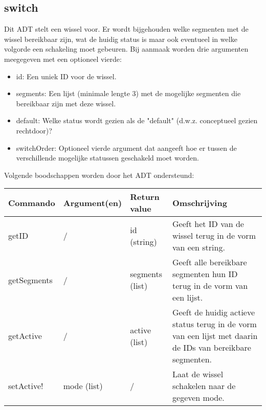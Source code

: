 \documentclass{article}
\begin{document}
\subsection{switch} %
Dit ADT stelt een wissel voor. Er wordt bijgehouden welke segmenten met de wissel bereikbaar zijn, wat de huidig status is maar ook eventueel in welke volgorde een schakeling moet gebeuren. Bij aanmaak worden drie argumenten meegegeven met een optioneel vierde:
\begin{itemize}
  \item id: Een uniek ID voor de wissel.
  \item segments: Een lijst (minimale lengte 3) met de mogelijke segmenten die bereikbaar zijn met deze wissel.
  \item default: Welke status wordt gezien als de "default" (d.w.z. conceptueel gezien rechtdoor)?
  \item switchOrder: Optioneel vierde argument dat aangeeft hoe er tussen de verschillende mogelijke statussen geschakeld moet worden.
\end{itemize}
Volgende boodschappen worden door het ADT ondersteund:
\begin{center}
    \begin{tabular}{ | l | l | l | p{8cm} |}
    \hline
    Commando & Argument(en) & Return value & Omschrijving \\ \hline
    getID & / & id (string) & Geeft het ID van de wissel terug in de vorm van een string. \\ \hline
    getSegments & / & segments (list) & Geeft alle bereikbare segmenten hun ID terug in de vorm van een lijst. \\ \hline
    getActive & / & active (list) & Geeft de huidig actieve status terug in de vorm van een lijst met daarin de IDs van bereikbare segmenten. \\ \hline
    setActive! & mode (list) & / & Laat de wissel schakelen naar de gegeven mode. \\ \hline
    \end{tabular}
\end{center}
\end{document}
